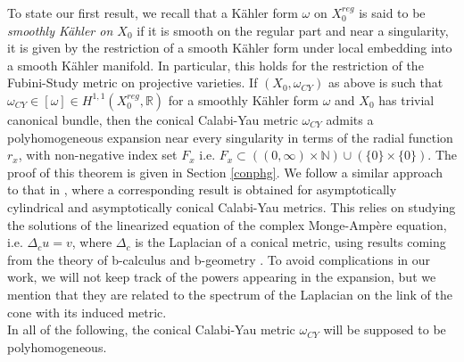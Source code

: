\documentclass[a4paper,11pt]{article}
\newenvironment{customthm}[1]  {\renewcommand\theinnercustomthm{#1}\innercustomthm}
  {\endinnercustomthm}
\def\R{\mathbb{R}}
\def\N{\mathbb{N}}
\begin{document}
To state our first result, we recall that a Kähler form $\omega$ on $X_0^{reg}$ is said to be \emph{smoothly Kähler on $X_0$} if it is smooth on the regular part and near a singularity, it is given by the restriction of a smooth Kähler form under local embedding into a smooth Kähler manifold. In particular, this holds for the restriction of the Fubini-Study metric on projective varieties.
\begin{customthm}{A} \label{tmA} 
If $(X_0, \omega_{CY})$ as above is such that $\omega_{CY} \in [\omega] \in H^{1,1}(X_0^{reg}, \R)$ for a smoothly Kähler form $\omega$ and $X_0$ has trivial canonical bundle, then the conical Calabi-Yau metric $\omega_{CY}$ admits a polyhomogeneous expansion near every singularity in terms of the radial function $r_x$, with non-negative index set $F_x$ i.e. $F_x \subset \left( (0, \infty) \times \N \right) \cup \left( \{0 \} \times \{  0\} \right)$.
\end{customthm}
The proof of this theorem is given in Section \ref{conphg}. We follow a similar approach to that in \cite{conlon_moduli_2015}, where a corresponding result is obtained for asymptotically cylindrical and asymptotically conical Calabi-Yau metrics. This relies on studying the solutions of the linearized equation of the complex Monge-Ampère equation, i.e. $\Delta_c u = v$, where $\Delta_c$ is the Laplacian of a conical metric, using results coming from the theory of b-calculus and b-geometry \cite{melrose_atiyah-patodi-singer_1993, Rafe_elliptic, melrose_pseudodifferential_1990, melrose_calculus_1992}. To avoid complications in our work, we will not keep track of the powers appearing in the expansion, but we mention that they are related to the spectrum of the Laplacian on the link of the cone with its induced metric.\\

In all of the following, the conical Calabi-Yau metric $\omega_{CY}$ will be supposed to be polyhomogeneous.
\end{document}
